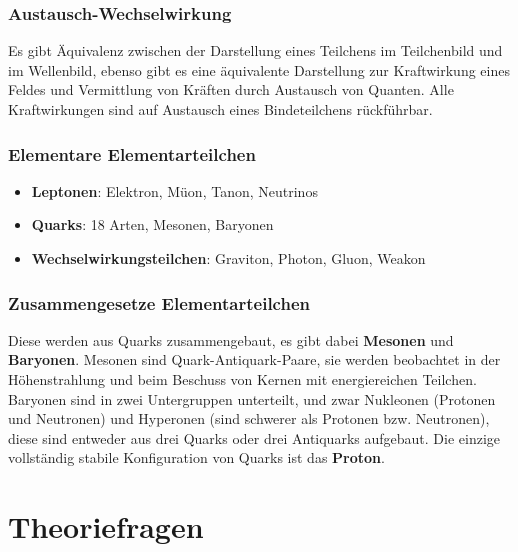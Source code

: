 \documentclass[12pt,a4paper,ngerman]{article}
\begin{document}
\subsubsection*{Austausch-Wechselwirkung}
Es gibt Äquivalenz zwischen der Darstellung eines Teilchens im Teilchenbild und im Wellenbild, ebenso gibt es eine äquivalente Darstellung zur Kraftwirkung eines Feldes und Vermittlung von Kräften durch Austausch von Quanten. Alle Kraftwirkungen sind auf Austausch eines Bindeteilchens rückführbar. 

\subsubsection*{Elementare Elementarteilchen}
\begin{itemize}
\item \textbf{Leptonen}: Elektron, Müon, Tanon, Neutrinos
\item \textbf{Quarks}: 18 Arten, Mesonen, Baryonen
\item \textbf{Wechselwirkungsteilchen}: Graviton, Photon, Gluon, Weakon
\end{itemize}

\subsubsection*{Zusammengesetze Elementarteilchen}
Diese werden aus Quarks zusammengebaut, es gibt dabei \textbf{Mesonen} und \textbf{Baryonen}. 
Mesonen sind Quark-Antiquark-Paare, sie werden beobachtet in der Höhenstrahlung und beim Beschuss von Kernen mit energiereichen Teilchen. \\
Baryonen sind in zwei Untergruppen unterteilt, und zwar Nukleonen (Protonen und Neutronen) und Hyperonen (sind schwerer als Protonen bzw. Neutronen), diese sind entweder aus drei Quarks oder drei Antiquarks aufgebaut. 
Die einzige vollständig stabile Konfiguration von Quarks ist das \textbf{Proton}. 



















\pagebreak

\section*{Theoriefragen}
\end{document}
